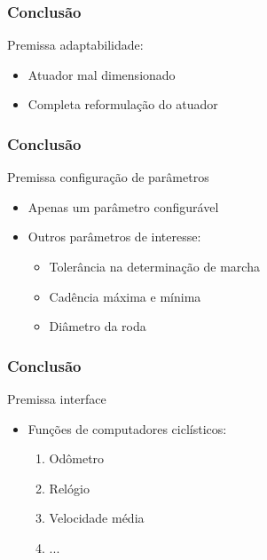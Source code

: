\documentclass{beamer}
\begin{document}
\begin{frame}
 \frametitle{Conclusão}

Premissa adaptabilidade:

\begin{itemize}
  \item Atuador mal dimensionado
  \item Completa reformulação do atuador
\end{itemize}
\end{frame}

\begin{frame}
  \frametitle{Conclusão}
Premissa configuração de parâmetros
  \begin{itemize}
    \item Apenas um parâmetro configurável
    \item Outros parâmetros de interesse:
     \begin{itemize}
        \item Tolerância na determinação de marcha
        \item Cadência máxima e mínima
        \item Diâmetro da roda
     \end{itemize}
  \end{itemize}

\end{frame}

\begin{frame}
  \frametitle{Conclusão}
Premissa interface
  \begin{itemize}
   \item Funções de computadores ciclísticos:
    \begin{enumerate}
      \item Odômetro
      \item Relógio
      \item Velocidade média
      \item ...
    \end{enumerate}
  \end{itemize}
\end{frame}
\end{document}
